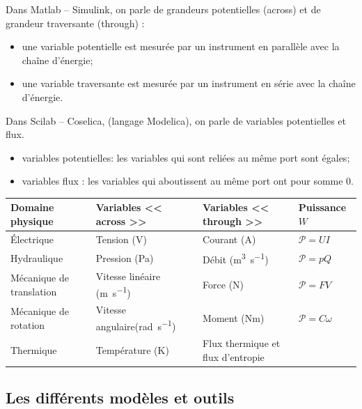 Dans Matlab -- Simulink, on parle de grandeurs potentielles (across) et de grandeur traversante (through) : 
\begin{itemize}
\item une variable potentielle est mesurée par un instrument
en parallèle avec la chaîne d’énergie;
\item une variable traversante est mesurée par un instrument
en série avec la chaîne d’énergie.
\end{itemize}

Dans Scilab -- Coselica, (langage Modelica), on parle de variables potentielles et flux.
\begin{itemize}
\item variables potentielles: les variables qui sont reliées au même port sont égales;
\item variables flux : les variables qui aboutissent au
même port ont pour somme 0.
\end{itemize}


\begin{center}
\begin{tabular}{llll}
\midrule
Domaine physique & Variables << across >> &  Variables << through >> & Puissance $\si{W}$\\ \hline
Électrique & Tension (\si{V})& Courant (\si{A}) & $\mathcal{P}=UI$\\ 
Hydraulique & Pression (\si{Pa})& Débit (\si{m^3.s^{-1}}) & $\mathcal{P}=pQ$\\ 
Mécanique de translation & Vitesse linéaire (\si{m.s^{-1}})& Force (\si{N})& $\mathcal{P}=FV$\\ 
Mécanique de rotation & Vitesse angulaire(\si{rad.s^{-1}}) & Moment (\si{Nm})& $\mathcal{P}=C\omega$\\ 
Thermique & Température (K)& Flux thermique et flux d'entropie & \\ 
\bottomrule
\end{tabular}
\end{center}

\subsection{Les différents modèles et outils}

